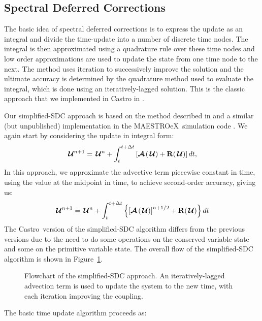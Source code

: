 \documentclass[times,preprint]{aastex631}
\newcommand{\castro}{{\sf Castro}}
\newcommand{\maestroex}{{\sf MAESTROeX}}
\newcommand{\Uc}{{\,\bm{\mathcal{U}}}}
\newcommand{\Rb}{{\bf R}}
\newcommand{\Adv}[1]{{\left [\boldsymbol{\mathcal{A}} \left(#1\right)\right]}}
\newcommand{\Advs}[1]{\boldsymbol{\mathcal{A}} \left(#1\right)}
\newcommand{\MarginPar}[1]{\marginpar{\vskip-\baselineskip\raggedright\tiny\sffamily\hrule\smallskip{\color{red}#1}\par\smallskip\hrule}}
\begin{document}
\subsection{Spectral Deferred Corrections}

The basic idea of spectral deferred corrections \MarginPar{ref} is to express the
update as an integral and divide the time-update into a number of
discrete time nodes.  The integral is then approximated using a
quadrature rule over these time nodes and low order approximations are
used to update the state from one time node to the next.  The method
uses iteration to successively improve the solution and the ultimate
accuracy is determined by the quadrature method used to evaluate the
integral, which is done using an iteratively-lagged solution.  This is the
classic approach that we implemented in Castro in \citet{castro_sdc}.

Our simplified-SDC approach is based on the method described in \citet{SDC-old}
and a similar (but unpublished) implementation in the \maestroex\ simulation
code \citep{maestroex}. We again start by considering the update in integral
form:
\begin{equation}
\Uc^{n+1} = \Uc^n + \int_t^{t+\Delta t} \left [ \Advs{\Uc} + \Rb(\Uc) \right ] dt,
\end{equation}
In this approach, we
approximate the advective term
piecewise constant in time, using the value at the midpoint in time,
to achieve second-order accuracy, giving us:
\begin{equation}
\label{eq:integral:simplesdc}
\Uc^{n+1} = \Uc^n + \int_t^{t+\Delta t} \left \{ \Adv{\Uc}^{n+1/2} + \Rb(\Uc) \right \} dt
\end{equation}
The \castro\ version of the simplified-SDC algorithm
differs from the previous versions due to the need to do some operations
on the conserved variable state and some on the primitive variable
state.   The overall flow of the simplified-SDC algorithm is shown
in Figure~\ref{fig:sdc_flowchart}.


\begin{figure}[t]
\caption{\label{fig:sdc_flowchart} Flowchart of the simplified-SDC
  approach.  An iteratively-lagged advection term is used to update
  the system to the new time, with each iteration improving the
  coupling.}
\end{figure}

The basic time update algorithm proceeds as:
\end{document}

